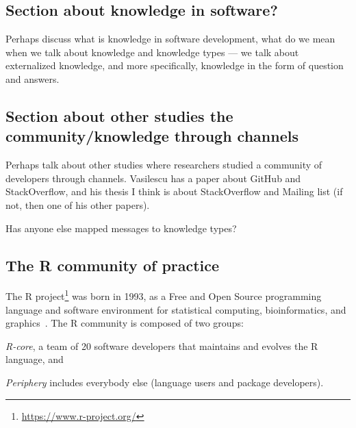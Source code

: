 \subsection{Section about knowledge in software?}
Perhaps discuss what is knowledge in software development, what do we mean when we talk about knowledge and knowledge types --- we talk about externalized knowledge, and more specifically, knowledge in the form of question and answers. 

\subsection{Section about other studies the community/knowledge through channels}
Perhaps talk about other studies where researchers studied a community of developers through channels. Vasilescu has a paper about GitHub and StackOverflow, and his thesis I think is about StackOverflow and Mailing list (if not, then one of his other papers).

Has anyone else mapped messages to knowledge types?

\subsection{The R community of practice}
    
    The R project\footnote{\url{https://www.r-project.org/}} was born in 1993, as a Free and Open Source programming language and software environment for statistical computing, bioinformatics, and graphics~\cite{Ihaka1996}.
    The R community is composed of two groups:
    \begin{enumerate*}[label=(\arabic*)]
      \item \textit{R-core}, a team of 20 software developers that maintains and evolves the R language, and
      \item \textit{Periphery} includes everybody else (language users and package developers).
    \end{enumerate*}


